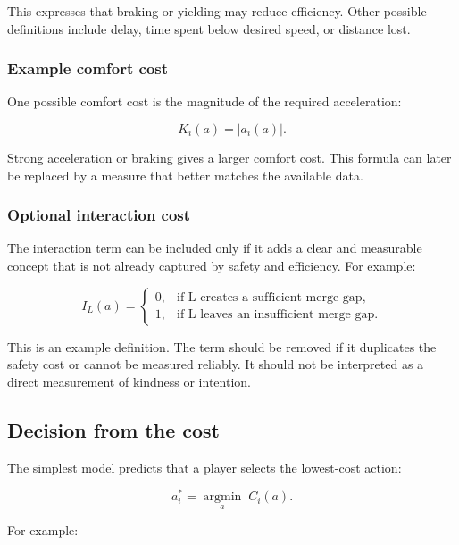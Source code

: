 \documentclass[11pt,a4paper]{article}
\begin{document}
This expresses that braking or yielding may reduce efficiency. Other possible definitions include delay, time spent below desired speed, or distance lost.

\subsubsection{Example comfort cost}

One possible comfort cost is the magnitude of the required acceleration:

\begin{equation}
K_i(a)=|a_i(a)|.
\end{equation}

Strong acceleration or braking gives a larger comfort cost. This formula can later be replaced by a measure that better matches the available data.

\subsubsection{Optional interaction cost}

The interaction term can be included only if it adds a clear and measurable concept that is not already captured by safety and efficiency. For example:

\begin{equation}
I_L(a)
=
\begin{cases}
0, & \text{if L creates a sufficient merge gap},\\
1, & \text{if L leaves an insufficient merge gap}.
\end{cases}
\end{equation}

This is an example definition. The term should be removed if it duplicates the safety cost or cannot be measured reliably. It should not be interpreted as a direct measurement of kindness or intention.

\subsection{Decision from the cost}

The simplest model predicts that a player selects the lowest-cost action:

\begin{equation}
a_i^*
=
\underset{a}{\operatorname{argmin}}\;C_i(a).
\end{equation}

For example:
\end{document}
